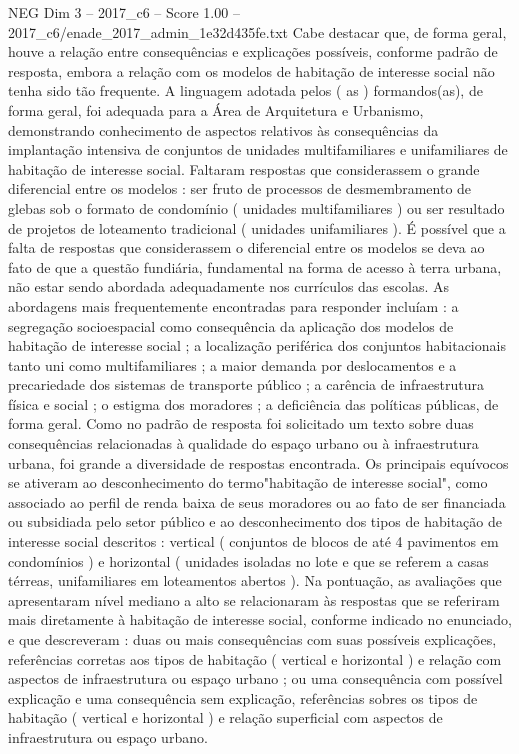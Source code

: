 \begin{textsample}{NEG Dim 3 – 2017\_c6 – Score 1.00 – 2017\_c6/enade\_2017\_admin\_1e32d435fe.txt}
Cabe destacar que, de forma geral, houve a relação entre consequências e explicações possíveis, conforme padrão de resposta, embora a relação com os modelos de habitação de interesse social não tenha sido tão frequente.
A linguagem adotada pelos ( as ) formandos(as), de forma geral, foi adequada para a Área de Arquitetura e Urbanismo, demonstrando conhecimento de aspectos relativos às consequências da implantação intensiva de conjuntos de unidades multifamiliares e unifamiliares de habitação de interesse social.
Faltaram respostas que considerassem o grande diferencial entre os modelos : ser fruto de processos de desmembramento de glebas sob o formato de condomínio ( unidades multifamiliares ) ou ser resultado de projetos de loteamento tradicional ( unidades unifamiliares ).
É possível que a falta de respostas que considerassem o diferencial entre os modelos se deva ao fato de que a questão fundiária, fundamental na forma de acesso à terra urbana, não estar sendo abordada adequadamente nos currículos das escolas.
As abordagens mais frequentemente encontradas para responder incluíam : a segregação socioespacial como consequência da aplicação dos modelos de habitação de interesse social ; a localização periférica dos conjuntos habitacionais tanto uni como multifamiliares ; a maior demanda por deslocamentos e a precariedade dos sistemas de transporte público ; a carência de infraestrutura física e social ; o estigma dos moradores ; a deficiência das políticas públicas, de forma geral.
Como no padrão de resposta foi solicitado um texto sobre duas consequências relacionadas à qualidade do espaço urbano ou à infraestrutura urbana, foi grande a diversidade de respostas encontrada.
Os principais equívocos se ativeram ao desconhecimento do termo"habitação de interesse social", como associado ao perfil de renda baixa de seus moradores ou ao fato de ser financiada ou subsidiada pelo setor público e ao desconhecimento dos tipos de habitação de interesse social descritos : vertical ( conjuntos de blocos de até 4 pavimentos em condomínios ) e horizontal ( unidades isoladas no lote e que se referem a casas térreas, unifamiliares em loteamentos abertos ).
Na pontuação, as avaliações que apresentaram nível mediano a alto se relacionaram às respostas que se referiram mais diretamente à habitação de interesse social, conforme indicado no enunciado, e que descreveram : duas ou mais consequências com suas possíveis explicações, referências corretas aos tipos de habitação ( vertical e horizontal ) e relação com aspectos de infraestrutura ou espaço urbano ; ou uma consequência com possível explicação e uma consequência sem explicação, referências sobres os tipos de habitação ( vertical e horizontal ) e relação superficial com aspectos de infraestrutura ou espaço urbano.

\end{textsample}
